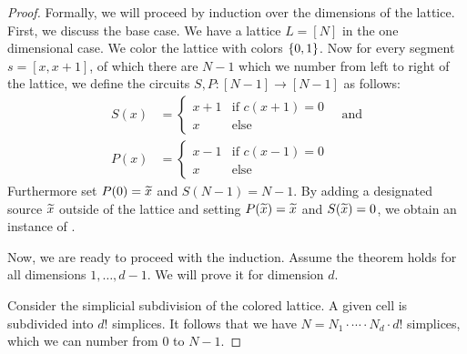 \begin{proof}
	Formally, we will proceed by induction over the dimensions of the lattice. First, we discuss the base case. We have a lattice $L = [N]$ in the one dimensional case. We color the lattice with colors $\left\{0, 1\right\}$. Now for every segment $s = [x, x+1]$, of which there are $N-1$ which we number from left to right of the lattice, we define the circuits $S, P : [N-1] \rightarrow [N-1]$ as follows:
	\begin{align*}
		S(x) & = \begin{cases}
			         x + 1 & \text{if $c(x+1) = 0$} \\
			         x     & \text{else}
		         \end{cases} \quad \text{and} \\
		P(x) & = \begin{cases}
			         x - 1 & \text{if $c(x-1) = 0$} \\
			         x     & \text{else}
		         \end{cases}
	\end{align*}
	Furthermore set $P(0) = \widetilde{x}$ and $S(N-1) = N-1$. By adding a designated source $\widetilde{x}$ outside of the lattice and setting $P(\widetilde{x}) = \widetilde{x}$ and $S(\widetilde{x}) = 0$, we obtain an instance of \EndOfLine.

	Now, we are ready to proceed with the induction. Assume the theorem holds for all dimensions $1, \dots, d-1$. We will prove it for dimension $d$.

	Consider the simplicial subdivision of the colored lattice. A given cell is subdivided into ${d!}$ simplices. It follows that we have $N = N_1 \cdot \cdots \cdot N_d \cdot {d!}$ simplices, which we can number from $0$ to $N-1$.


\end{proof}
